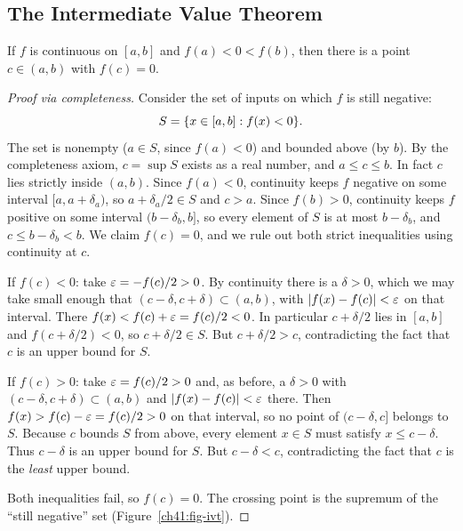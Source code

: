 \subsection*{The Intermediate Value Theorem}

\begin{theorem}
\label{ch41:ivt}
If $f$ is continuous on $[a,b]$ and $f(a) < 0 < f(b)$, then there is a point
$c\in(a,b)$ with $f(c)=0$.
\end{theorem}

\begin{proof}[Proof via completeness]
Consider the set of inputs on which $f$ is still negative:
\[
  S = \{x \in [a,b] : f(x) < 0\}.
\]
The set is nonempty ($a\in S$, since $f(a)<0$) and bounded above (by $b$). By the completeness
axiom, $c=\sup S$ exists as a real number, and $a \le c \le b$. In fact $c$ lies strictly inside
$(a,b)$. Since $f(a)<0$, continuity keeps $f$ negative on some interval $[a, a+\delta_a)$, so
$a+\delta_a/2 \in S$ and $c > a$. Since $f(b)>0$, continuity keeps $f$ positive on some interval
$(b-\delta_b, b]$, so every element of $S$ is at most $b-\delta_b$, and $c \le b-\delta_b < b$.
We claim $f(c)=0$, and we rule out both strict inequalities using continuity at $c$.

If $f(c)<0$: take $\varepsilon = -f(c)/2 > 0$. By continuity there is a $\delta>0$, which we may take
small enough that $(c-\delta, c+\delta) \subset (a,b)$, with $\lvert f(x)-f(c)\rvert<\varepsilon$ on that
interval. There $f(x) < f(c)+\varepsilon = f(c)/2 < 0$. In particular $c+\delta/2$ lies in $[a,b]$ and
$f(c+\delta/2)<0$, so $c+\delta/2 \in S$. But $c+\delta/2 > c$, contradicting the fact that $c$ is
an upper bound for $S$.

If $f(c)>0$: take $\varepsilon = f(c)/2 > 0$ and, as before, a $\delta>0$ with
$(c-\delta, c+\delta) \subset (a,b)$ and $\lvert f(x)-f(c)\rvert<\varepsilon$ there. Then
$f(x) > f(c)-\varepsilon = f(c)/2 > 0$ on that interval, so no point of $(c-\delta, c]$ belongs to $S$.
Because $c$ bounds $S$ from above, every element $x \in S$ must satisfy $x \le c-\delta$.
Thus $c-\delta$ is an upper bound for $S$. But $c-\delta < c$, contradicting the fact that $c$ is
the \emph{least} upper bound.

Both inequalities fail, so $f(c)=0$. The crossing point is the supremum of the ``still negative'' set
(Figure~\ref{ch41:fig-ivt}).
\end{proof}

